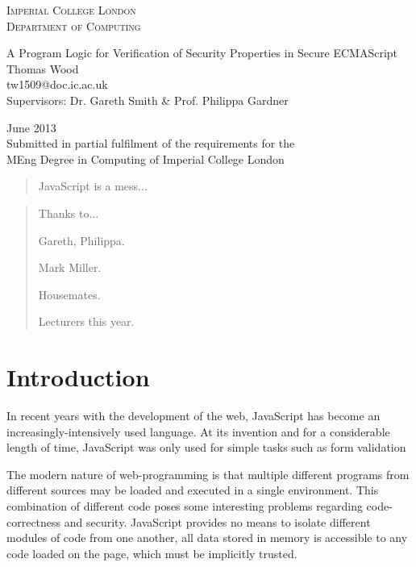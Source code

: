 \documentclass[a4paper]{report}
\begin{document}
\begin{titlepage}
\begin{center}
  \textsc{\Large Imperial College London} \\[0.1cm]
  \textsc{\Large Department of Computing}

  \vfill

  {\Huge A Program Logic for Verification of Security Properties in Secure
  ECMAScript} \\[3cm]

  {\LARGE Thomas Wood} \\
  tw1509@doc.ic.ac.uk \\[1cm]

  {\Large Supervisors: Dr. Gareth Smith \& Prof. Philippa Gardner}

  \vfill

  {\Large June 2013} \\[0.5cm]

  Submitted in partial fulfilment of the requirements for the\\
  MEng Degree in Computing of Imperial College London
\end{center}
\end{titlepage}

\begin{abstract}
  JavaScript is a mess...
\end{abstract}

\renewcommand{\abstractname}{Acknowledgements}
\begin{abstract}
  Thanks to...

  Gareth, Philippa.

  Mark Miller.

  Housemates.

  Lecturers this year.
\end{abstract}

\tableofcontents

\chapter{Introduction}
  In recent years with the development of the web, JavaScript has become an
  increasingly-intensively used language. At its invention and for a
  considerable length of time, JavaScript was only used for simple tasks such as
  form validation
  
  The modern nature of web-programming
  is that multiple different programs from different sources may be loaded and
  executed in a single environment. This combination of different code poses
  some interesting problems regarding code-correctness and security. JavaScript
  provides no means to isolate different modules of code from one another, all
  data stored in memory is accessible to any code loaded on the page, which must
  be implicitly trusted.
\end{document}
